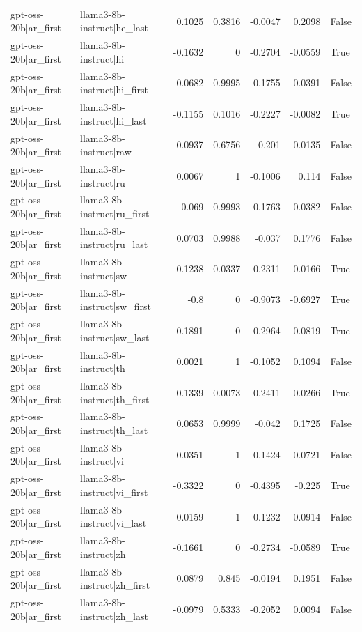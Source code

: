 \begin{table}
\begin{tabular}{l l r r r r l}
gpt-oss-20b|ar_first & llama3-8b-instruct|he_last & 0.1025 & 0.3816 & -0.0047 & 0.2098 & False \\
gpt-oss-20b|ar_first & llama3-8b-instruct|hi & -0.1632 & 0 & -0.2704 & -0.0559 & True \\
gpt-oss-20b|ar_first & llama3-8b-instruct|hi_first & -0.0682 & 0.9995 & -0.1755 & 0.0391 & False \\
gpt-oss-20b|ar_first & llama3-8b-instruct|hi_last & -0.1155 & 0.1016 & -0.2227 & -0.0082 & True \\
gpt-oss-20b|ar_first & llama3-8b-instruct|raw & -0.0937 & 0.6756 & -0.201 & 0.0135 & False \\
gpt-oss-20b|ar_first & llama3-8b-instruct|ru & 0.0067 & 1 & -0.1006 & 0.114 & False \\
gpt-oss-20b|ar_first & llama3-8b-instruct|ru_first & -0.069 & 0.9993 & -0.1763 & 0.0382 & False \\
gpt-oss-20b|ar_first & llama3-8b-instruct|ru_last & 0.0703 & 0.9988 & -0.037 & 0.1776 & False \\
gpt-oss-20b|ar_first & llama3-8b-instruct|sw & -0.1238 & 0.0337 & -0.2311 & -0.0166 & True \\
gpt-oss-20b|ar_first & llama3-8b-instruct|sw_first & -0.8 & 0 & -0.9073 & -0.6927 & True \\
gpt-oss-20b|ar_first & llama3-8b-instruct|sw_last & -0.1891 & 0 & -0.2964 & -0.0819 & True \\
gpt-oss-20b|ar_first & llama3-8b-instruct|th & 0.0021 & 1 & -0.1052 & 0.1094 & False \\
gpt-oss-20b|ar_first & llama3-8b-instruct|th_first & -0.1339 & 0.0073 & -0.2411 & -0.0266 & True \\
gpt-oss-20b|ar_first & llama3-8b-instruct|th_last & 0.0653 & 0.9999 & -0.042 & 0.1725 & False \\
gpt-oss-20b|ar_first & llama3-8b-instruct|vi & -0.0351 & 1 & -0.1424 & 0.0721 & False \\
gpt-oss-20b|ar_first & llama3-8b-instruct|vi_first & -0.3322 & 0 & -0.4395 & -0.225 & True \\
gpt-oss-20b|ar_first & llama3-8b-instruct|vi_last & -0.0159 & 1 & -0.1232 & 0.0914 & False \\
gpt-oss-20b|ar_first & llama3-8b-instruct|zh & -0.1661 & 0 & -0.2734 & -0.0589 & True \\
gpt-oss-20b|ar_first & llama3-8b-instruct|zh_first & 0.0879 & 0.845 & -0.0194 & 0.1951 & False \\
gpt-oss-20b|ar_first & llama3-8b-instruct|zh_last & -0.0979 & 0.5333 & -0.2052 & 0.0094 & False \\

\end{tabular}
\end{table}
